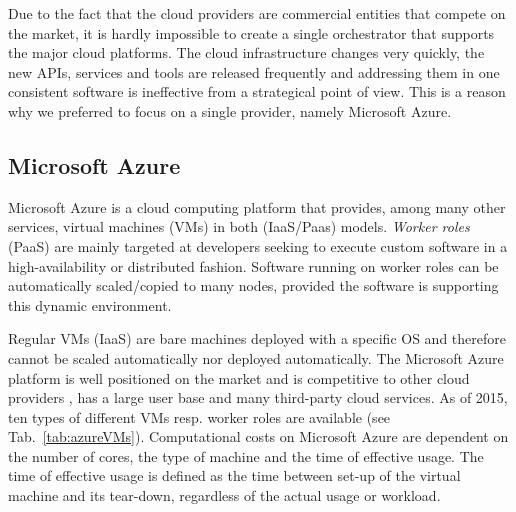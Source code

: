 \documentclass[3p,times]{elsarticle}
\begin{document}
Due to the fact that the cloud providers are commercial entities that compete on the market, it is hardly impossible to create a single orchestrator that supports the major cloud platforms. The cloud infrastructure changes very quickly, the new APIs, services and tools are released frequently and addressing them in one consistent software is ineffective from a strategical point of view. This is a reason why we preferred to focus on a single provider, namely Microsoft Azure.








\subsection{Microsoft Azure}

Microsoft Azure is a cloud computing platform that provides, among many other services, virtual machines (VMs) in both (IaaS/Paas) models. \textit{Worker roles} (PaaS) are mainly targeted at developers seeking to execute custom software in a high-availability or distributed fashion.
Software running on worker roles can be automatically scaled/copied to many nodes, provided the software is supporting this dynamic environment. 

Regular VMs (IaaS) are bare machines deployed with a specific OS and therefore cannot be scaled automatically nor deployed automatically.
The Microsoft Azure platform is well positioned on the market and is competitive to other cloud providers \cite{cloudScores} \cite{twister4azure}, has a large user base and many third-party cloud services. As of 2015, ten types of different VMs resp. worker roles are available (see Tab.~\ref{tab:azureVMs}). Computational costs on Microsoft Azure are dependent on the number of cores, the type of machine and the time of effective usage. The time of effective usage is defined as the time between set-up of the virtual machine and its tear-down, regardless of the actual usage or workload. \\
\end{document}
